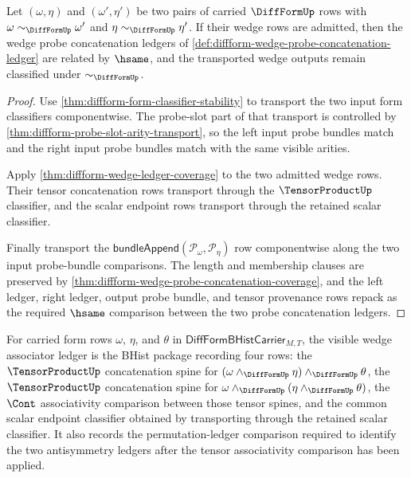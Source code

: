 \begin{theorem}
\label{thm:diffform-wedge-probe-concatenation-classifier-stability}
Let $(\omega,\eta)$ and $(\omega',\eta')$ be two pairs of carried
$\DiffFormUp$ rows with $\omega\sim_{\DiffFormUp}\omega'$ and
$\eta\sim_{\DiffFormUp}\eta'$. If their wedge rows are admitted, then the
wedge probe concatenation ledgers of
\autoref{def:diffform-wedge-probe-concatenation-ledger} are related by
$\hsame$, and the transported wedge outputs remain classified under
$\sim_{\DiffFormUp}$.
\end{theorem}
\begin{proof}
Use \autoref{thm:diffform-form-classifier-stability} to transport the two
input form classifiers componentwise. The probe-slot part of that transport is
controlled by \autoref{thm:diffform-probe-slot-arity-transport}, so the left
input probe bundles match and the right input probe bundles match with the
same visible arities.

Apply \autoref{thm:diffform-wedge-ledger-coverage} to the two admitted wedge
rows. Their tensor concatenation rows transport through the
$\TensorProductUp$ classifier, and the scalar endpoint rows transport through
the retained scalar classifier.

Finally transport the
$\mathsf{bundleAppend}(\mathcal{P}_\omega,\mathcal{P}_\eta)$ row
componentwise along the two input probe-bundle comparisons. The length and
membership clauses are preserved by
\autoref{thm:diffform-wedge-probe-concatenation-coverage}, and the left
ledger, right ledger, output probe bundle, and tensor provenance rows repack
as the required $\hsame$ comparison between the two probe concatenation
ledgers.
\end{proof}

\begin{definition}
\label{def:diffform-wedge-associator-ledger}
For carried form rows $\omega$, $\eta$, and $\theta$ in
$\mathsf{DiffFormBHistCarrier}_{M,T}$, the visible wedge associator ledger is
the BHist package recording four rows: the $\TensorProductUp$ concatenation
spine for $(\omega\wedge_{\DiffFormUp}\eta)\wedge_{\DiffFormUp}\theta$, the
$\TensorProductUp$ concatenation spine for
$\omega\wedge_{\DiffFormUp}(\eta\wedge_{\DiffFormUp}\theta)$, the $\Cont$
associativity comparison between those tensor spines, and the common scalar
endpoint classifier obtained by transporting through the retained scalar
classifier. It also records the permutation-ledger comparison required to
identify the two antisymmetry ledgers after the tensor associativity
comparison has been applied.
\end{definition}

